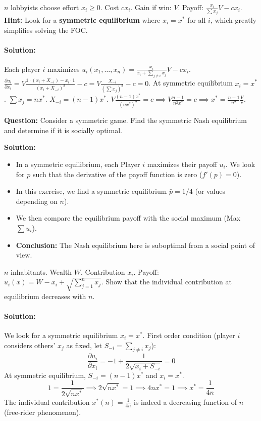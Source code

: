 \begin{exemple}
$n$ lobbyists choose effort $x_i \ge 0$. Cost $cx_i$. Gain if win: $V$. Payoff: $\frac{x_i}{\sum x_j}V - cx_i$.
\textbf{Hint:} Look for a \textbf{symmetric equilibrium} where $x_i = x^*$ for all $i$, which greatly simplifies solving the FOC.

\paragraph{Solution:}
Each player $i$ maximizes $u_i(x_1, \dots, x_n) = \frac{x_i}{x_i + \sum_{j \ne i} x_j} V - c x_i$.
$\frac{\partial u_i}{\partial x_i} = V \frac{1 \cdot (x_i + X_{-i}) - x_i \cdot 1}{(x_i + X_{-i})^2} - c = V \frac{X_{-i}}{(\sum x_j)^2} - c = 0$.
At symmetric equilibrium $x_i = x^*$. $\sum x_j = n x^*$. $X_{-i} = (n-1)x^*$.
$V \frac{(n-1)x^*}{(n x^*)^2} = c \implies V \frac{n-1}{n^2 x^*} = c \implies x^* = \frac{n-1}{n^2} \frac{V}{c}$.
\end{exemple}

\begin{exemple}
\textbf{Question:}
Consider a symmetric game. Find the symmetric Nash equilibrium and determine if it is socially optimal.

\textbf{Solution:}
\begin{itemize}
    \item In a symmetric equilibrium, each Player $i$ maximizes their payoff $u_i$. We look for $p$ such that the derivative of the payoff function is zero ($f'(p) = 0$).
    \item In this exercise, we find a symmetric equilibrium $\bar{p} = 1/4$ (or values depending on $n$).
    \item We then compare the equilibrium payoff with the social maximum (Max $\sum u_i$).
    \item \textbf{Conclusion:} The Nash equilibrium here is suboptimal from a social point of view.
\end{itemize}
\end{exemple}

\begin{exemple}
$n$ inhabitants. Wealth $W$. Contribution $x_i$. Payoff: $u_i(x) = W - x_i + \sqrt{\sum_{j=1}^n x_j}$. Show that the individual contribution at equilibrium decreases with $n$.

\paragraph{Solution:}
We look for a symmetric equilibrium $x_i = x^*$.
First order condition (player $i$ considers others' $x_j$ as fixed, let $S_{-i} = \sum_{j \ne i} x_j$):
$$ \frac{\partial u_i}{\partial x_i} = -1 + \frac{1}{2\sqrt{x_i + S_{-i}}} = 0 $$
At symmetric equilibrium, $S_{-i} = (n-1)x^*$ and $x_i = x^*$.
$$ 1 = \frac{1}{2\sqrt{n x^*}} \implies 2\sqrt{n x^*} = 1 \implies 4n x^* = 1 \implies x^* = \frac{1}{4n} $$
The individual contribution $x^*(n) = \frac{1}{4n}$ is indeed a decreasing function of $n$ (free-rider phenomenon).
\end{exemple}
